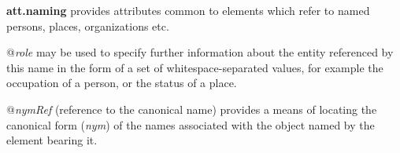 \begin{sansreflist}
  
\item [\textbf{att.naming}] provides attributes common to elements which refer to named persons, places, organizations etc.\hfil\\[-10pt]\begin{sansreflist}
    \item[@{\itshape role}]
  may be used to specify further information about the entity referenced by this name in the form of a set of whitespace-separated values, for example the occupation of a person, or the status of a place.
    \item[@{\itshape nymRef}]
  (reference to the canonical name) provides a means of locating the canonical form (\textit{nym}) of the names associated with the object named by the element bearing it.
\end{sansreflist}  
\end{sansreflist}
